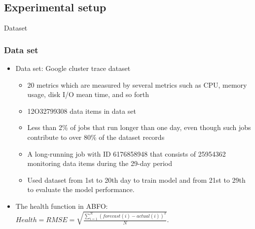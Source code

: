 \documentclass{beamer}
\begin{document}
\subsection{Experimental setup}
\begin{frame}{Dataset}
	\frametitle{Data set}
	\begin{itemize}
		\item {
			Data set: Google cluster trace dataset
			\begin{itemize}
			\item 20 metrics which are measured by several metrics such as CPU, memory usage, disk I/O mean time, and so forth
			\item 12O32799308 data items in data set
			\item  Less than 2\% of jobs that run longer than one day, even though such jobs contribute to over 80\% of the dataset records
			\item A long-running job with ID 6176858948 that consists of 25954362 monitoring data items during the 29-day period
			\item Used dataset from 1st to 20th day to train model and from 21st to 29th to evaluate the model performance.
			\end{itemize}
		}
		\item{
			The health function in ABFO: \newline
			$Health = RMSE = \sqrt{  \frac{\sum_{i=1}^N( forecast(i) - actual(i) )^2}{N} }	\label{eq_fitness} $. 
			}
	\end{itemize}
\end{frame}
\end{document}
